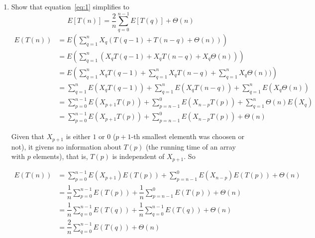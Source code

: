 \documentclass{article}
\begin{document}
\begin{enumerate}[label=(\alph*)]
  \item Show that equation~\ref{eq:1} simplifies to
  \begin{equation}
    E[T(n)] = \frac{2}{n}\sum_{q=0}^{n-1}E[T(q)] + \Theta(n)
    \label{eq:2}
  \end{equation}
  \bigbreak
  \begin{equation*}
  \begin{aligned}
E(T(n)) &= E\left(\sum_{q=1}^n X_q(T(q - 1) + T(n - q) + \Theta(n))\right)\\
 &= E\left(\sum_{q=1}^n (X_qT(q - 1) + X_qT(n - q) + X_q\Theta(n))\right)\\
&= E\left(\sum_{q=1}^n X_qT(q - 1) + \sum_{q=1}^nX_qT(n - q) + \sum_{q=1}^nX_q\Theta(n))\right)\\
&= \sum_{q=1}^n E(X_q T(q-1)) + \sum_{q=1}^n E(X_q T(n - q)) + \sum_{q=1}^n E(X_q \Theta(n))\\
&= \sum_{p = 0}^{n-1} E(X_{p+1} T(p)) + \sum_{p=n-1}^0 E(X_{n-p} T(p)) + \sum_{q=1}^n \Theta(n)E(X_q )\\
&= \sum_{p = 0}^{n-1} E(X_{p+1} T(p)) + \sum_{p=n-1}^0 E(X_{n-p} T(p)) + \Theta(n)
\end{aligned}
  \end{equation*}
  
  Given that $X_{p+1}$ is either $1$ or $0$ ($p+1$-th smallest elementh was choosen or not), it givens no information about $T(p)$ (the running time of an array with $p$ elements), that is, $T(p)$ is independent of $X_{p+1}$. So
  
  
  \begin{equation*}
  \begin{aligned}
E(T(n)) &= \sum_{p = 0}^{n-1} E(X_{p+1})E( T(p)) + \sum_{p=n-1}^0 E(X_{n-p})E( T(p)) + \Theta(n) \\
&= \dfrac{1}{n}\sum_{p = 0}^{n-1} E( T(p)) + \dfrac{1}{n}\sum_{p=n-1}^0 E( T(p)) + \Theta(n) \\
&= \dfrac{1}{n}\sum_{q = 0}^{n-1} E( T(q)) + \dfrac{1}{n}\sum_{q=0}^{n-1} E( T(q)) + \Theta(n) \\
&= \dfrac{2}{n}\sum_{q = 0}^{n-1} E( T(q))  + \Theta(n) \\
\end{aligned}
  \end{equation*}


\end{enumerate}
\end{document}

